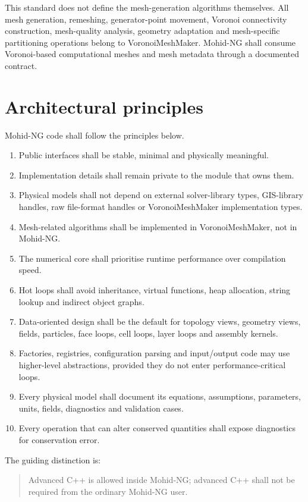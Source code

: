 \documentclass[11pt,a4paper]{article}
\begin{document}
This standard does not define the mesh-generation algorithms themselves. All mesh generation, remeshing, generator-point movement, Voronoi connectivity construction, mesh-quality analysis, geometry adaptation and mesh-specific partitioning operations belong to VoronoiMeshMaker. Mohid-NG shall consume Voronoi-based computational meshes and mesh metadata through a documented contract.

\section{Architectural principles}

Mohid-NG code shall follow the principles below.

\begin{enumerate}
  \item Public interfaces shall be stable, minimal and physically meaningful.
  \item Implementation details shall remain private to the module that owns them.
  \item Physical models shall not depend on external solver-library types, GIS-library handles, raw file-format handles or VoronoiMeshMaker implementation types.
  \item Mesh-related algorithms shall be implemented in VoronoiMeshMaker, not in Mohid-NG.
  \item The numerical core shall prioritise runtime performance over compilation speed.
  \item Hot loops shall avoid inheritance, virtual functions, heap allocation, string lookup and indirect object graphs.
  \item Data-oriented design shall be the default for topology views, geometry views, fields, particles, face loops, cell loops, layer loops and assembly kernels.
  \item Factories, registries, configuration parsing and input/output code may use higher-level abstractions, provided they do not enter performance-critical loops.
  \item Every physical model shall document its equations, assumptions, parameters, units, fields, diagnostics and validation cases.
  \item Every operation that can alter conserved quantities shall expose diagnostics for conservation error.
\end{enumerate}

The guiding distinction is:

\begin{quote}
Advanced C++ is allowed inside Mohid-NG; advanced C++ shall not be required from the ordinary Mohid-NG user.
\end{quote}
\end{document}
